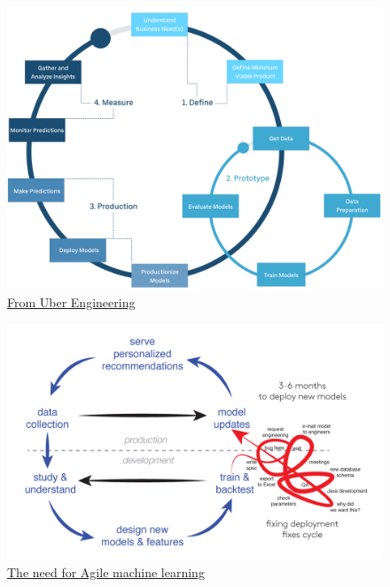 \documentclass[aspectratio=169,10pt,xcolor=x11names,english,french]{beamer}
\begin{document}
	\begin{frame}
		\begin{figure}
			\centering
			\includegraphics[scale=0.19]{img/cycle.png}
			\caption{\href{https://eng.uber.com/scaling-michelangelo/}{From Uber Engineering}}
		\end{figure}
		\note{}
	\end{frame}
	
	\begin{frame}
		\begin{figure}
			\centering
			\includegraphics[scale=0.24]{img/cycle-white.png}
			\caption{\href{https://johann.schleier-smith.com/blog/2015/08/09/need-for-agile-machine-learning.html}{The need for Agile machine learning}}
		\end{figure}
		\note{}
	\end{frame}
	
\end{document}
